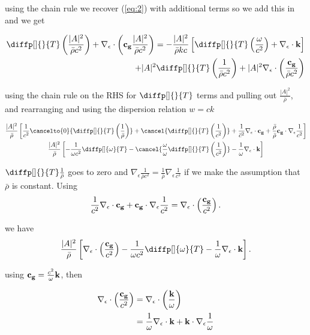 using the chain rule we recover (\ref{eq:2}) with additional terms so we add
this in and we get

\begin{align*}
  \diffp[]{}{T} \left( \frac{|A|^2}{\bar \rho c^2}\right) + \nabla _{\epsilon
  } \cdot \left( {\bf c_{g}} \frac{|A|^2}{\bar \rho c^2}\right) = -\frac{|A|^2}{\bar \rho kc} \left[
  \diffp[]{}{T} \left(\frac{\omega}{c^2}\right) + \nabla _{\epsilon } \cdot {\bf
  k} \right] \\
  + |A|^2 \diffp[]{}{T} \left(\frac{1}{\bar \rho c^2}\right) + |A|^2
  \nabla _{\epsilon } \cdot \left(\frac{{\bf c_{g}}}{\bar \rho c^2}\right)
\end{align*}

using the chain rule on the RHS for $ \diffp[]{}{T}$ terms and pulling out
$ \frac{|A|^2}{\bar \rho }$, and rearranging and using the dispersion relation
$w = ck$

\begin{gather*}
    \frac{|A|^2}{\bar \rho } \left[ \frac{1}{c^2} \cancelto{0}{\diffp[]{}{T} \left( \frac{1}{\bar \rho } \right)} + \cancel{\diffp[]{}{T} \left( \frac{1}{c^2} \right)} + \frac{1}{\bar c^2} \nabla _{\epsilon } \cdot {\bf
    c_{g}} + \frac{\bar \rho}{\bar \rho} {\bf c_{g}} \cdot \nabla _{\epsilon }\frac{1}{c^2} \right] \\
\frac{|A|^2}{\bar \rho } \left[ - \frac{1}{\omega c^2}\diffp[]{\omega }{T}
  - \cancel{\frac{\omega}{\omega}\diffp[]{}{T} \left( \frac{1}{c^2}\right)} - \frac{1}{\omega
}\nabla_{\epsilon } \cdot {\bf k}  \right]
\end{gather*}

$\diffp[]{}{T} \frac{1}{\bar \rho }$ goes to zero and $\nabla _{\epsilon
} \frac{1}{\bar \rho c^2} = \frac{1}{\bar \rho }\nabla _{\epsilon
} \frac{1}{c^2}$ if we make the assumption that $\bar \rho $ is constant. Using
\[
\frac{1}{c^2}\nabla _{\epsilon }\cdot {\bf c_{g}} + {\bf c_{g}} \cdot \nabla
_{\epsilon }\frac{1}{c^2} = \nabla _{\epsilon } \cdot \left( \frac{{\bf
c_{g}}}{c^2} \right)
.\] 

we have
\[
  \frac{|A|^2}{\bar \rho } \left[\nabla _{\epsilon } \cdot \left( \frac{{\bf
  c_{g}}}{c^2} \right) - \frac{1}{\omega c^2} \diffp[]{\omega }{T}
- \frac{1}{\omega }\nabla _{\epsilon }\cdot {\bf k} \right]
.\] 

using ${\bf c_{g}} = \frac{c^2}{\omega } {\bf k}$, then

\begin{align*}
  \nabla _{\epsilon } \cdot \left( \frac{{\bf
      c_{g}}}{c^2} \right) &= \nabla _{\epsilon } \cdot \left( \frac{{\bf k}}{\omega
  } \right) \\
  &= \frac{1}{\omega } \nabla _{\epsilon }\cdot {\bf k} + {\bf k} \cdot \nabla
  _{\epsilon } \frac{1}{\omega }
\end{align*}

